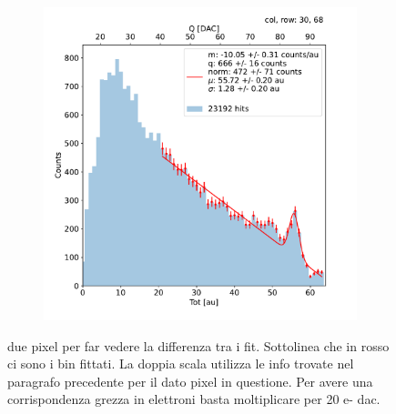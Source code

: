 \begin{figure}[h!]
\begin{subfigure}{.5\textwidth}
            \includegraphics[width=.99\linewidth]{figures/charaterization/fit_line_gauss_r69.pdf}
            \label{fig:fit_r69}
            \end{subfigure}
            \caption{due pixel per far vedere la differenza tra i fit. Sottolinea che in rosso ci sono i bin fittati. La doppia scala utilizza le info trovate nel paragrafo precedente per il dato pixel in questione. Per avere una corrispondenza grezza in elettroni basta moltiplicare per 20 e- dac. }
        \end{figure}            

